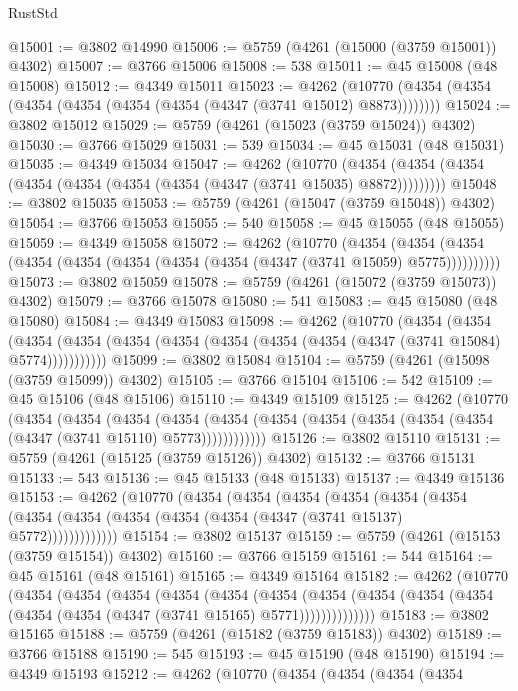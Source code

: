 \begin{lexlean}{RustStd}
\begin{coremodule}
@15001 := @3802 @14990
@15006 := @5759 (@4261 (@15000 (@3759 @15001)) @4302)
@15007 := @3766 @15006
@15008 := 538
@15011 := @45 @15008 (@48 @15008)
@15012 := @4349 @15011
@15023 := @4262
    (@10770 (@4354 (@4354 (@4354 (@4354 (@4354 (@4354 (@4347 (@3741 @15012) @8873))))))))
@15024 := @3802 @15012
@15029 := @5759 (@4261 (@15023 (@3759 @15024)) @4302)
@15030 := @3766 @15029
@15031 := 539
@15034 := @45 @15031 (@48 @15031)
@15035 := @4349 @15034
@15047 := @4262
    (@10770 (@4354 (@4354 (@4354 (@4354 (@4354 (@4354 (@4354 (@4347 (@3741 @15035) @8872)))))))))
@15048 := @3802 @15035
@15053 := @5759 (@4261 (@15047 (@3759 @15048)) @4302)
@15054 := @3766 @15053
@15055 := 540
@15058 := @45 @15055 (@48 @15055)
@15059 := @4349 @15058
@15072 := @4262
    (@10770
      (@4354 (@4354 (@4354 (@4354 (@4354 (@4354 (@4354 (@4354 (@4347 (@3741 @15059) @5775))))))))))
@15073 := @3802 @15059
@15078 := @5759 (@4261 (@15072 (@3759 @15073)) @4302)
@15079 := @3766 @15078
@15080 := 541
@15083 := @45 @15080 (@48 @15080)
@15084 := @4349 @15083
@15098 := @4262
    (@10770
      (@4354
        (@4354
          (@4354 (@4354 (@4354 (@4354 (@4354 (@4354 (@4354 (@4347 (@3741 @15084) @5774)))))))))))
@15099 := @3802 @15084
@15104 := @5759 (@4261 (@15098 (@3759 @15099)) @4302)
@15105 := @3766 @15104
@15106 := 542
@15109 := @45 @15106 (@48 @15106)
@15110 := @4349 @15109
@15125 := @4262
    (@10770
      (@4354
        (@4354
          (@4354
            (@4354 (@4354 (@4354 (@4354 (@4354 (@4354 (@4354 (@4347 (@3741 @15110) @5773))))))))))))
@15126 := @3802 @15110
@15131 := @5759 (@4261 (@15125 (@3759 @15126)) @4302)
@15132 := @3766 @15131
@15133 := 543
@15136 := @45 @15133 (@48 @15133)
@15137 := @4349 @15136
@15153 := @4262
    (@10770
      (@4354
        (@4354
          (@4354
            (@4354
              (@4354
                (@4354 (@4354 (@4354 (@4354 (@4354 (@4354 (@4347 (@3741 @15137) @5772)))))))))))))
@15154 := @3802 @15137
@15159 := @5759 (@4261 (@15153 (@3759 @15154)) @4302)
@15160 := @3766 @15159
@15161 := 544
@15164 := @45 @15161 (@48 @15161)
@15165 := @4349 @15164
@15182 := @4262
    (@10770
      (@4354
        (@4354
          (@4354
            (@4354
              (@4354
                (@4354
                  (@4354
                    (@4354 (@4354 (@4354 (@4354 (@4354 (@4347 (@3741 @15165) @5771))))))))))))))
@15183 := @3802 @15165
@15188 := @5759 (@4261 (@15182 (@3759 @15183)) @4302)
@15189 := @3766 @15188
@15190 := 545
@15193 := @45 @15190 (@48 @15190)
@15194 := @4349 @15193
@15212 := @4262
    (@10770
      (@4354
        (@4354
          (@4354
            (@4354

\end{coremodule}
\end{lexlean}
